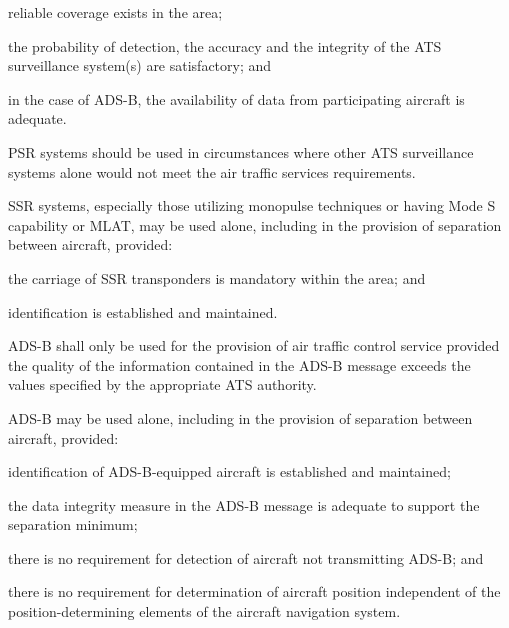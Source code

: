 \begin{enumnoss}
    \begin{enumalph}
        \item reliable coverage exists in the area;
        \item the probability of detection, the accuracy and the integrity of the ATS surveillance system(s) are satisfactory; and
        \item in the case of ADS-B, the availability of data from participating aircraft is adequate.
    \end{enumalph}

    \item PSR systems should be used in circumstances where other ATS surveillance systems alone would not meet the air traffic services requirements.
    \item SSR systems, especially those utilizing monopulse techniques or having Mode S capability or MLAT, may be used alone, including in the provision of separation between aircraft, provided:

    \begin{enumalph}
        \item the carriage of SSR transponders is mandatory within the area; and
        \item identification is established and maintained.
    \end{enumalph}

    \item ADS-B shall only be used for the provision of air traffic control service provided the quality of the information contained in the ADS-B message exceeds the values specified by the appropriate ATS authority.
    \item ADS-B may be used alone, including in the provision of separation between aircraft, provided:

    \begin{enumalph}
        \item identification of ADS-B-equipped aircraft is established and maintained;
        \item the data integrity measure in the ADS-B message is adequate to support the separation minimum;
        \item there is no requirement for detection of aircraft not transmitting ADS-B; and
        \item there is no requirement for determination of aircraft position independent of the position-deter\-mining elements of the aircraft navigation system.
    \end{enumalph}


\end{enumnoss}
